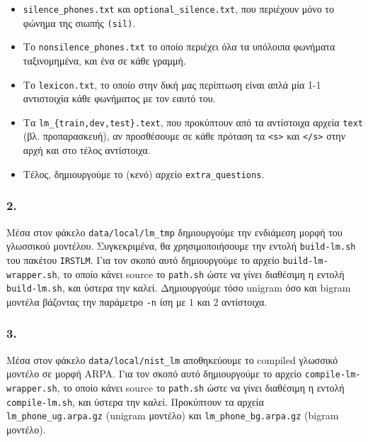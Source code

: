 \documentclass[a4paper, 12pt]{article}
\begin{document}
            \begin{itemize}
                \item \verb|silence_phones.txt| και \verb|optional_silence.txt|, που περιέχουν μόνο το φώνημα της σιωπής \verb|(sil)|.
                
                \item Το \verb|nonsilence_phones.txt| το οποίο περιέχει όλα τα υπόλοιπα φωνήματα ταξινομημένα, και ένα σε κάθε γραμμή.
                
                \item Το \verb|lexicon.txt|, το οποίο στην δική μας περίπτωση είναι απλά μία 1-1 αντιστοιχία κάθε φωνήματος με τον εαυτό του.
                
                \item Τα \verb|lm_{train,dev,test}.text|, που προκύπτουν από τα αντίστοιχα αρχεία \verb|text| (βλ. προπαρασκευή), αν προσθέσουμε σε κάθε πρόταση τα \verb|<s>| και \verb|</s>| στην αρχή και στο τέλος αντίστοιχα.
                
                \item Τέλος, δημιουργούμε το (κενό) αρχείο \verb|extra_questions|.
            \end{itemize}
        
        \subsubsection*{2.}
            Μέσα στον φάκελο \verb|data/local/lm_tmp| δημιουργούμε την ενδιάμεση μορφή του γλωσσικού μοντέλου. Συγκεκριμένα, θα χρησιμοποιήσουμε την εντολή \verb|build-lm.sh| του πακέτου \verb|IRSTLM|. Για τον σκοπό αυτό δημιουργούμε το αρχείο \verb|build-lm-wrapper.sh|, το οποίο κάνει source το \verb|path.sh| ώστε να γίνει διαθέσιμη η εντολή \verb|build-lm.sh|, και ύστερα την καλεί. Δημιουργούμε τόσο unigram όσο και bigram μοντέλα βάζοντας την παράμετρο \verb|-n| ίση με $1$ και $2$ αντίστοιχα.
        
        \subsubsection*{3.}
            Μέσα στον φάκελο \verb|data/local/nist_lm| αποθηκεύουμε το compiled γλωσσικό μοντέλο σε μορφή ARPA. Για τον σκοπό αυτό δημιουργούμε το αρχείο \verb|compile-lm-wrapper.sh|, το οποίο κάνει source το \verb|path.sh| ώστε να γίνει διαθέσιμη η εντολή \verb|compile-lm.sh|, και ύστερα την καλεί. Προκύπτουν τα αρχεία \verb|lm_phone_ug.arpa.gz| (unigram μοντέλο) και \verb|lm_phone_bg.arpa.gz| (bigram μοντέλο).
        
\end{document}

